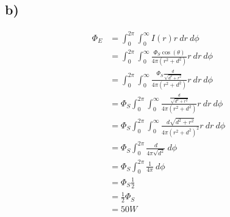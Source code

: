 \documentclass[a4paper]{scrartcl}
\begin{document}



\subsection*{b)}
\begin{align*}
  \Phi_E &= \int_{0}^{2\pi} \int_{0}^{\infty} I(r)r\ dr\ d\phi \\
  &= \int_{0}^{2\pi} \int_{0}^{\infty} \frac{\Phi_S \cos(\theta)}{4\pi(r^2 + d^2)} r\ dr\ d\phi \\
  &= \int_{0}^{2\pi} \int_{0}^{\infty} \frac{\Phi_S \frac{d}{\sqrt{d^2 + r^2}}}{4\pi(r^2 + d^2)} r\ dr\ d\phi \\
  &= \Phi_S \int_{0}^{2\pi} \int_{0}^{\infty} \frac{\frac{d}{\sqrt{d^2 + r^2}}}{4\pi(r^2 + d^2)} r\ dr\ d\phi \\
  &= \Phi_S \int_{0}^{2\pi} \int_{0}^{\infty} \frac{d\sqrt{d^2+r^2}}{4\pi \left(r^2+d^2\right)^2} r\ dr\ d\phi \\
  &= \Phi_S \int_{0}^{2\pi} \frac{d}{4\pi \sqrt{d^2}}\ d\phi \\
  &= \Phi_S \int_{0}^{2\pi} \frac{1}{4\pi}\ d\phi \\
  &= \Phi_S \frac{1}{2} \\
  &= \frac{1}{2} \Phi_S \\
  &= 50 W
\end{align*}
\end{document}
